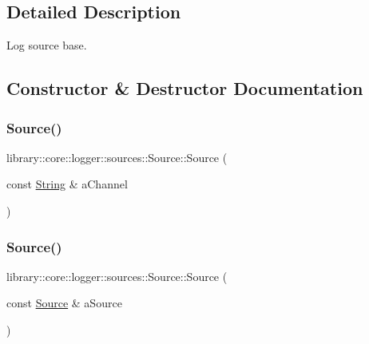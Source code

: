 \subsection{Detailed Description}
Log source base. 

\subsection{Constructor \& Destructor Documentation}
\mbox{\label{classlibrary_1_1core_1_1logger_1_1sources_1_1_source_a3491482f16ae952683c7c6fbc3d3a1be}} 
\subsubsection{\texorpdfstring{Source()}{Source()}\hspace{0.1cm}{\footnotesize\ttfamily [1/2]}}
{\footnotesize\ttfamily library\+::core\+::logger\+::sources\+::\+Source\+::\+Source (\begin{DoxyParamCaption}\item[{const \mbox{\hyperlink{classlibrary_1_1core_1_1types_1_1_string}{String}} \&}]{a\+Channel }\end{DoxyParamCaption})}

\mbox{\label{classlibrary_1_1core_1_1logger_1_1sources_1_1_source_ae694934c9cc6666e753c777e3fe4982f}} 
\subsubsection{\texorpdfstring{Source()}{Source()}\hspace{0.1cm}{\footnotesize\ttfamily [2/2]}}
{\footnotesize\ttfamily library\+::core\+::logger\+::sources\+::\+Source\+::\+Source (\begin{DoxyParamCaption}\item[{const \mbox{\hyperlink{classlibrary_1_1core_1_1logger_1_1sources_1_1_source}{Source}} \&}]{a\+Source }\end{DoxyParamCaption})}

